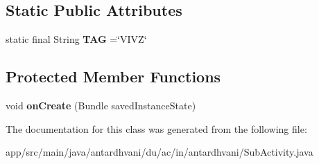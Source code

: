 \subsection*{Static Public Attributes}
\begin{DoxyCompactItemize}
\item 
\hypertarget{classantardhvani_1_1du_1_1ac_1_1in_1_1antardhvani_1_1_sub_activity_afc5ff37a5572b1a4bf122deb3ba0e184}{}static final String {\bfseries T\+A\+G} =\char`\"{}V\+I\+V\+Z\char`\"{}\label{classantardhvani_1_1du_1_1ac_1_1in_1_1antardhvani_1_1_sub_activity_afc5ff37a5572b1a4bf122deb3ba0e184}

\end{DoxyCompactItemize}
\subsection*{Protected Member Functions}
\begin{DoxyCompactItemize}
\item 
\hypertarget{classantardhvani_1_1du_1_1ac_1_1in_1_1antardhvani_1_1_sub_activity_ac2b4091304f65eda7a113a523e8e2f21}{}void {\bfseries on\+Create} (Bundle saved\+Instance\+State)\label{classantardhvani_1_1du_1_1ac_1_1in_1_1antardhvani_1_1_sub_activity_ac2b4091304f65eda7a113a523e8e2f21}

\end{DoxyCompactItemize}


The documentation for this class was generated from the following file\+:\begin{DoxyCompactItemize}
\item 
app/src/main/java/antardhvani/du/ac/in/antardhvani/Sub\+Activity.\+java\end{DoxyCompactItemize}
